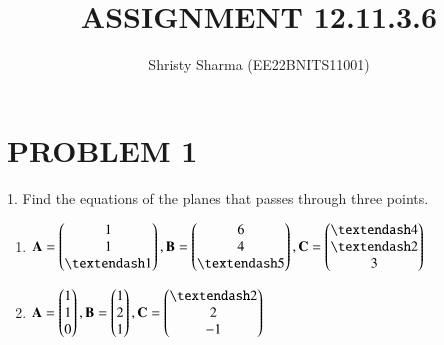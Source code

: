 \documentclass[A4,11pt,twocolumn]{IEEEtran}
\begin{document}
\let\StandardTheFigure\thefigure
\let\vec\mathbf
\renewcommand{\thefigure}{\theproblem}



\def\putbox#1#2#3{\makebox[0in][l]{\makebox[#1][l]{}\raisebox{\baselineskip}[0in][0in]{\raisebox{#2}[0in][0in]{#3}}}}
     \def\rightbox#1{\makebox[0in][r]{#1}}
     \def\centbox#1{\makebox[0in]{#1}}
     \def\topbox#1{\raisebox{-\baselineskip}[0in][0in]{#1}}
     \def\midbox#1{\raisebox{-0.5\baselineskip}[0in][0in]{#1}}

\vspace{3cm}


\title{ASSIGNMENT 12.11.3.6}
\author{Shristy Sharma (EE22BNITS11001)}





\maketitle

\newpage


\bigskip

\renewcommand{\thefigure}{\theenumi}
\renewcommand{\thetable}{\theenumi}


%

%
%


\section{PROBLEM 1}
1. Find the equations of the planes that passes through three points.
\begin{enumerate}
\item $\vec{A}= \myvec{1\\1\\– 1}, \vec{B}=\myvec{6\\4\\– 5},\vec{C}= \myvec{– 4\\– 2\\3}$
\item $\vec{A}= \myvec{1\\1\\0}, \vec{B}= \myvec{1\\2\\1}, \vec{C}= \myvec{– 2\\2\\-1}$
\end{enumerate}
\end{document}
